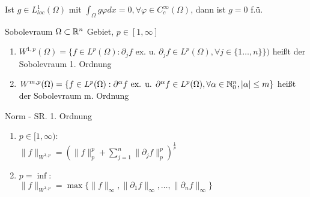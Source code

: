 \begin{korrolar}
    Ist \(g\in L_{loc}^1(\Omega)\) mit \(\int_\Omega g\varphi dx = 0,
    \forall \varphi \in C_c^\infty(\Omega)\), dann ist \(g=0\) f.ü.
\end{korrolar}
    
\begin{definition}{Sobolevraum}
    \(\Omega \subset \mathbb{R}^n\) Gebiet, \(p \in [1,\infty]\)
    \begin{enumerate}[label=(\roman*)]
        \item \(W^{1,p}(\Omega) = \{
            f\in L^p(\Omega):\partial_jf\text{ ex. u. } \partial_j f
            \in L^p(\Omega),\forall j\in\{1\dots,n\}\})\) heißt der Sobolevraum
            1. Ordnung
        \item \(W^{m,p}(\Omega) = \{f\in L^p(\Omega):\partial^\alpha f 
            \text{ ex. u. } \partial^\alpha f \in L^p(\Omega),
            \forall\alpha\in\mathbb{N}_0^n, |\alpha|\leq m\}\) heißt der Sobolevraum
            m. Ordnung
    \end{enumerate}
\end{definition}

\begin{definition}{Norm - SR. 1. Ordnung}

    \begin{enumerate}[label=(\roman*)]
        \item \(p\in [1,\infty)\):\\
            \( \|f\|_{W^{1,p}} = (\|f\|_p^p +
            \sum_{j=1}^{n}\|\partial_jf\|_p^p)^{\frac{1}{p}} \)
        \item \(p = \inf\):\\
            \( \|f\|_{W^{1,p}} =
            \max\{\|f\|_\infty, \|\partial_1f\|_\infty, \dots,
            \|\partial_nf\|_\infty\} \)
    \end{enumerate}
\end{definition}

